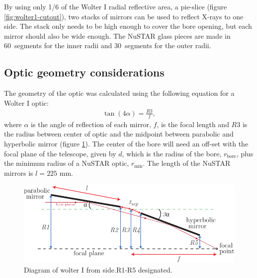 By using only 1/6 of the Wolter I radial reflective area, a pie-slice (figure \ref{fig:wolter1-cutout}), two stacks of mirrors can be used to reflect X-rays to one side. The stack only needs to be high enough to cover the bore opening, but each mirror should also be wide enough. The NuSTAR glass pieces are made in 60\degr\ segments for the inner radii and 30\degr\ segments for the outer radii.

\subsection{Optic geometry considerations}
The geometry of the optic was calculated using the following equation for a Wolter I optic:
\begin{eqnarray}\label{eq:wolter}
  \tan(4\alpha) = \frac{\mathit{R3}}{f},
\end{eqnarray}
where $\alpha$ is the angle of reflection of each mirror, $f$, is the focal length and $\mathit{R3}$ is the radius between center of optic and the midpoint between parabolic and hyperbolic mirror (figure \ref{fig:wolter1-diagram}). The center of the bore will need an off-set with the focal plane of the telescope, given by $d$, which is the radius of the bore, $r_{\text{bore}}$, plus the minimum radius of a NuSTAR optic, $r_{\text{min}}$. The length of the NuSTAR mirrors is $l = 225$ mm.
\begin{figure}[htbp]
  \centering
    \includegraphics[width=0.95\linewidth]{figures/cast/wolter1-diagram.pdf}
  \caption{Diagram of wolter I from side.R1-R5 designated.}
  \label{fig:wolter1-diagram}
\end{figure}

